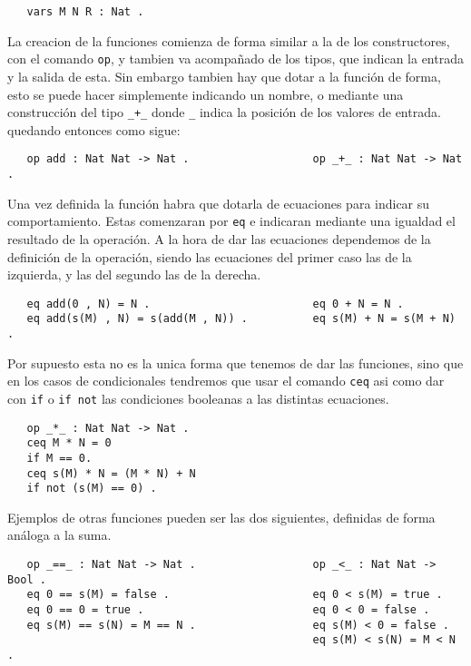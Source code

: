 {\codesize
\begin{verbatim}
   vars M N R : Nat .
\end{verbatim}
}

La creacion de la funciones comienza de forma similar a la de los constructores, con el comando \texttt{op}, y tambien va acompañado de los tipos, que indican la entrada y la salida de esta. Sin embargo tambien hay que dotar a la función de forma, esto se puede hacer simplemente indicando un nombre, o mediante una construcción del tipo \verb"_+_" donde \verb"_" indica la posición de los valores de entrada. quedando entonces como sigue: \par

{\codesize
\begin{verbatim}
   op add : Nat Nat -> Nat .                   op _+_ : Nat Nat -> Nat .
\end{verbatim}
}

Una vez definida la función habra que dotarla de ecuaciones para indicar su comportamiento. Estas comenzaran por \texttt{eq} e indicaran mediante una igualdad el resultado de la operación. A la hora de dar las ecuaciones dependemos de la definición de la operación, siendo las ecuaciones del primer caso las de la izquierda, y las del segundo las de la derecha. \par
{\codesize
\begin{verbatim}
   eq add(0 , N) = N .                         eq 0 + N = N .
   eq add(s(M) , N) = s(add(M , N)) .          eq s(M) + N = s(M + N) .
\end{verbatim}
}

Por supuesto esta no es la unica forma que tenemos de dar las funciones, sino que en los casos de condicionales tendremos que usar el comando \texttt{ceq} asi como dar con \texttt{if} o \texttt{if not} las condiciones booleanas a las distintas ecuaciones. \par

{\codesize
\begin{verbatim}
   op _*_ : Nat Nat -> Nat .
   ceq M * N = 0 
   if M == 0.
   ceq s(M) * N = (M * N) + N
   if not (s(M) == 0) .
\end{verbatim}
}

Ejemplos de otras funciones pueden ser las dos siguientes, definidas de forma análoga a la suma. \par

{\codesize
\begin{verbatim}
   op _==_ : Nat Nat -> Nat .                  op _<_ : Nat Nat -> Bool .
   eq 0 == s(M) = false .                      eq 0 < s(M) = true .
   eq 0 == 0 = true .                          eq 0 < 0 = false .
   eq s(M) == s(N) = M == N .                  eq s(M) < 0 = false .
                                               eq s(M) < s(N) = M < N .	

\end{verbatim}
}

